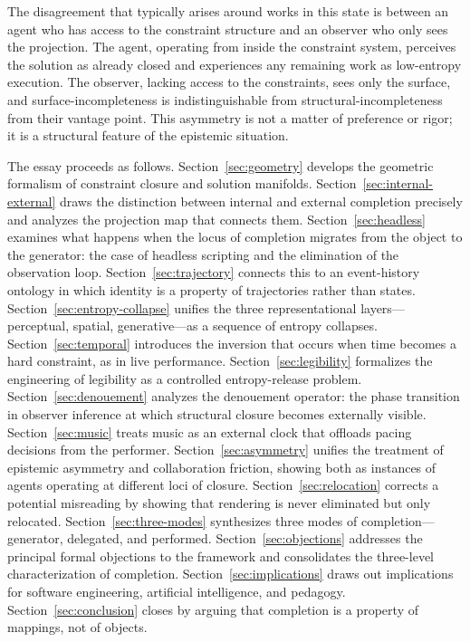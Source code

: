 \documentclass[11pt, twoside]{article}
\theoremstyle{plain}
\theoremstyle{definition}
\theoremstyle{remark}
\begin{document}
The disagreement that typically arises around works in this state is between an agent who has access to the constraint structure and an observer who only sees the projection. The agent, operating from inside the constraint system, perceives the solution as already closed and experiences any remaining work as low-entropy execution. The observer, lacking access to the constraints, sees only the surface, and surface-incompleteness is indistinguishable from structural-incompleteness from their vantage point. This asymmetry is not a matter of preference or rigor; it is a structural feature of the epistemic situation.

The essay proceeds as follows. Section~\ref{sec:geometry} develops the geometric formalism of constraint closure and solution manifolds. Section~\ref{sec:internal-external} draws the distinction between internal and external completion precisely and analyzes the projection map that connects them. Section~\ref{sec:headless} examines what happens when the locus of completion migrates from the object to the generator: the case of headless scripting and the elimination of the observation loop. Section~\ref{sec:trajectory} connects this to an event-history ontology in which identity is a property of trajectories rather than states. Section~\ref{sec:entropy-collapse} unifies the three representational layers---perceptual, spatial, generative---as a sequence of entropy collapses. Section~\ref{sec:temporal} introduces the inversion that occurs when time becomes a hard constraint, as in live performance. Section~\ref{sec:legibility} formalizes the engineering of legibility as a controlled entropy-release problem. Section~\ref{sec:denouement} analyzes the denouement operator: the phase transition in observer inference at which structural closure becomes externally visible. Section~\ref{sec:music} treats music as an external clock that offloads pacing decisions from the performer. Section~\ref{sec:asymmetry} unifies the treatment of epistemic asymmetry and collaboration friction, showing both as instances of agents operating at different loci of closure. Section~\ref{sec:relocation} corrects a potential misreading by showing that rendering is never eliminated but only relocated. Section~\ref{sec:three-modes} synthesizes three modes of completion---generator, delegated, and performed. Section~\ref{sec:objections} addresses the principal formal objections to the framework and consolidates the three-level characterization of completion. Section~\ref{sec:implications} draws out implications for software engineering, artificial intelligence, and pedagogy. Section~\ref{sec:conclusion} closes by arguing that completion is a property of mappings, not of objects.
\end{document}
